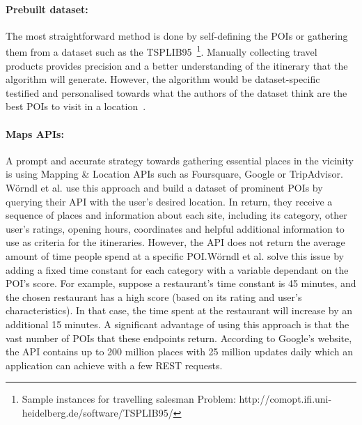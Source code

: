 \paragraph{Prebuilt dataset:} The most straightforward method is done by self-defining the POIs or gathering
them from a dataset such as the TSPLIB95~\footnote{Sample instances for
travelling salesman Problem:
http://comopt.ifi.uni-heidelberg.de/software/TSPLIB95/}. Manually collecting
travel products provides precision and a better understanding of the itinerary
that the algorithm will generate. However, the algorithm would be
dataset-specific testified and personalised towards what the authors of the
dataset think are the best POIs to visit in a location~\cite{Chou2021a,
Wisittipanich2020, Erbil}.

\paragraph{Maps APIs:} A prompt and accurate strategy towards gathering essential places in the
vicinity is using Mapping \& Location APIs such as Foursquare, Google or
TripAdvisor. Wörndl et al.\cite{Worndl2017} use this approach and build a
dataset of prominent POIs by querying their API with the user's desired location.
In return, they receive a sequence of places and information about each site,
including its category, other user's ratings, opening hours, coordinates and
helpful additional information to use as criteria for the itineraries. However,
the API does not return the average amount of time people spend at a specific
POI.Wörndl et al.\cite{Worndl2017} solve this issue by adding a fixed time
constant for each category with a variable dependant on the POI's score. For
example, suppose a restaurant's time constant is 45 minutes, and the chosen
restaurant has a high score (based on its rating and user's characteristics).
In that case, the time spent at the restaurant will increase by an additional
15 minutes. A significant advantage of using this approach is that the vast
number of POIs that these endpoints return. According to Google's website, the
API contains up to 200 million places with 25 million updates daily which an
application can achieve with a few REST requests\cite{iltifat2014generation, googleSite}.


